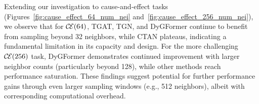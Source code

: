 Extending our 
investigation to cause-and-effect tasks (Figures~\ref{fig:cause_effect_64_num_nei} and~\ref{fig:cause_effect_256_num_nei}), we observe that for $\causeeffect{64}$, TGAT, TGN, and DyGFormer continue to benefit from sampling beyond 32 neighbors, while CTAN plateaus, indicating a fundamental limitation in its capacity and design. For the more challenging $\causeeffect{256}$ task, DyGFormer demonstrates continued improvement with larger neighbor counts (particularly beyond 128), while other methods reach performance saturation. These findings suggest potential for further performance gains through even larger sampling windows (e.g., 512 neighbors), albeit with corresponding computational overhead.






